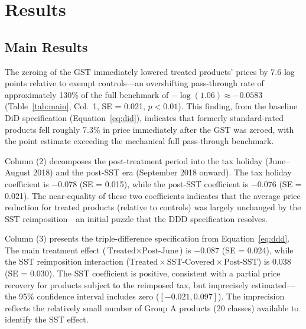 \documentclass[12pt]{article}
\begin{document}
\section{Results}

\subsection{Main Results}

The zeroing of the GST immediately lowered treated products' prices by 7.6 log points relative to exempt controls---an overshifting pass-through rate of approximately 130\% of the full benchmark of $-\log(1.06) \approx -0.0583$ (Table~\ref{tab:main}, Col.\ 1, SE = 0.021, $p < 0.01$). This finding, from the baseline DiD specification (Equation~\ref{eq:did}), indicates that formerly standard-rated products fell roughly 7.3\% in price immediately after the GST was zeroed, with the point estimate exceeding the mechanical full pass-through benchmark.

Column (2) decomposes the post-treatment period into the tax holiday (June--August 2018) and the post-SST era (September 2018 onward). The tax holiday coefficient is $-0.078$ (SE = 0.015), while the post-SST coefficient is $-0.076$ (SE = 0.021). The near-equality of these two coefficients indicates that the average price reduction for treated products (relative to controls) was largely unchanged by the SST reimposition---an initial puzzle that the DDD specification resolves.

Column (3) presents the triple-difference specification from Equation~\ref{eq:ddd}. The main treatment effect ($\text{Treated} \times \text{Post-June}$) is $-0.087$ (SE = 0.024), while the SST reimposition interaction ($\text{Treated} \times \text{SST-Covered} \times \text{Post-SST}$) is $0.038$ (SE = 0.030). The SST coefficient is positive, consistent with a partial price recovery for products subject to the reimposed tax, but imprecisely estimated---the 95\% confidence interval includes zero ($[-0.021, 0.097]$). The imprecision reflects the relatively small number of Group A products (20 classes) available to identify the SST effect.
\end{document}
